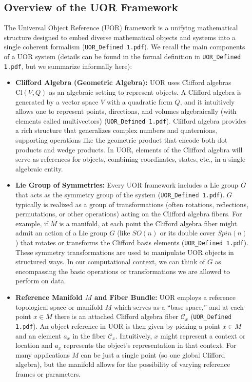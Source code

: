 \documentclass[11pt]{article}
\begin{document}
\subsection{Overview of the UOR Framework}
The Universal Object Reference (UOR) framework is a unifying mathematical structure designed to embed diverse mathematical objects and systems into a single coherent formalism (\texttt{UOR\_Defined 1.pdf}). We recall the main components of a UOR system (details can be found in the formal definition in \texttt{UOR\_Defined 1.pdf}, but we summarize informally here):
\begin{itemize}
    \item \textbf{Clifford Algebra (Geometric Algebra):} UOR uses Clifford algebras \(\mathrm{Cl}(V,Q)\) as an algebraic setting to represent objects. A Clifford algebra is generated by a vector space \(V\) with a quadratic form \(Q\), and it intuitively allows one to represent points, directions, and volumes algebraically (with elements called multivectors) (\texttt{UOR\_Defined 1.pdf}). Clifford algebra provides a rich structure that generalizes complex numbers and quaternions, supporting operations like the geometric product that encode both dot products and wedge products. In UOR, elements of the Clifford algebra will serve as references for objects, combining coordinates, states, etc., in a single algebraic entity.
    \item \textbf{Lie Group of Symmetries:} Every UOR framework includes a Lie group \(G\) that acts as the symmetry group of the system (\texttt{UOR\_Defined 1.pdf}). \(G\) typically is realized as a group of transformations (often rotations, reflections, permutations, or other operations) acting on the Clifford algebra fibers. For example, if \(M\) is a manifold, at each point the Clifford algebra fiber might admit an action of a Lie group \(G\) (like \(SO(n)\) or its double cover \(Spin(n)\)) that rotates or transforms the Clifford basis elements (\texttt{UOR\_Defined 1.pdf}). These symmetry transformations are used to manipulate UOR objects in structured ways. In our computational context, we can think of \(G\) as encompassing the basic operations or transformations we are allowed to perform on data.
    \item \textbf{Reference Manifold \(M\) and Fiber Bundle:} UOR employs a reference topological space or manifold \(M\) which serves as a “base space,” and at each point \(x \in M\) there is an attached Clifford algebra fiber \(\mathcal{C}_x\) (\texttt{UOR\_Defined 1.pdf}). An object reference in UOR is then given by picking a point \(x \in M\) and an element \(a_x\) in the fiber \(\mathcal{C}_x\). Intuitively, \(x\) might represent a context or location and \(a_x\) represents the object’s representation in that context. For many applications \(M\) can be just a single point (so one global Clifford algebra), but the manifold allows for the possibility of varying reference frames or parameters.

\end{itemize}
\end{document}

